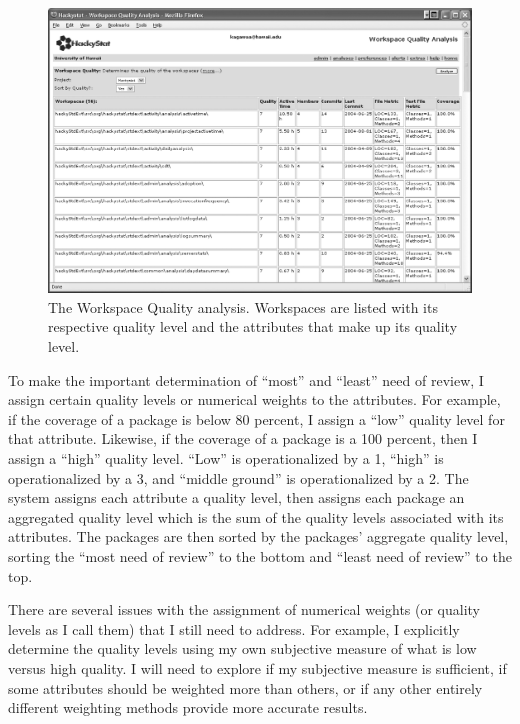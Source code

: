\documentclass[11pt,twocolumn]{article}
\begin{document}
\begin{figure}[ht]
  \centering
  \includegraphics[width=1.00\textwidth]{WorkspaceQuality.eps}
  \caption{The Workspace Quality analysis. Workspaces are listed with its
  respective quality level and the attributes that make up its quality
  level.
}
  \label{fig:WorkspaceQualityAnalysis}
\end{figure}

To make the important determination of ``most'' and ``least'' need of
review, I assign certain quality levels or numerical weights to the
attributes. For example, if the coverage of a package is below 80 percent,
I assign a ``low'' quality level for that attribute. Likewise, if the
coverage of a package is a 100 percent, then I assign a ``high'' quality
level. ``Low'' is operationalized by a 1, ``high'' is operationalized by a
3, and ``middle ground'' is operationalized by a 2. The system assigns each
attribute a quality level, then assigns each package an aggregated quality
level which is the sum of the quality levels associated with its
attributes. The packages are then sorted by the packages' aggregate quality
level, sorting the ``most need of review'' to the bottom and ``least need
of review'' to the top.

There are several issues with the assignment of numerical weights (or
quality levels as I call them) that I still need to address. For example, I
explicitly determine the quality levels using my own subjective measure of
what is low versus high quality. I will need to explore if my subjective
measure is sufficient, if some attributes should be weighted more than
others, or if any other entirely different weighting methods provide more
accurate results.
\end{document}
